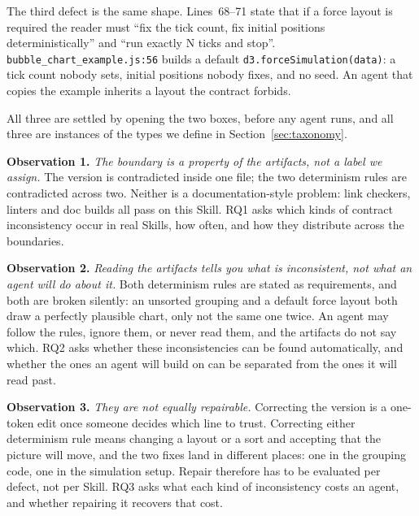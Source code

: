 The third defect is the same shape. Lines~68--71 state that if a force layout is
required the reader must ``fix the tick count, fix initial positions
deterministically'' and ``run exactly N ticks and stop''.
\texttt{bubble\_\allowbreak{}chart\_\allowbreak{}example.js:56} builds a default
\texttt{d3.force\allowbreak{}Simulation(data)}: a tick count nobody sets, initial positions
nobody fixes, and no seed. An agent that copies the example inherits a layout the
contract forbids.

All three are settled by opening the two boxes, before any agent runs, and all
three are instances of the types we define in Section~\ref{sec:taxonomy}.

\medskip\noindent\textbf{Observation 1.} \emph{The boundary is a property of the
artifacts, not a label we assign.} The version is contradicted inside one file;
the two determinism rules are contradicted across two. Neither is a
documentation-style problem: link checkers, linters and doc builds all pass on
this Skill. RQ1 asks which kinds of contract inconsistency occur in real Skills,
how often, and how they distribute across the boundaries.

\medskip\noindent\textbf{Observation 2.} \emph{Reading the artifacts tells you
what is inconsistent, not what an agent will do about it.} Both determinism
rules are stated as requirements, and both are broken silently: an unsorted
grouping and a default force layout both draw a perfectly plausible chart, only
not the same one twice. An agent may follow the rules, ignore them, or never read
them, and the artifacts do not say which. RQ2 asks whether these inconsistencies
can be found automatically, and whether the ones an agent will build on can be
separated from the ones it will read past.

\medskip\noindent\textbf{Observation 3.} \emph{They are not equally repairable.} Correcting the version is a one-token edit once someone decides
which line to trust. Correcting either determinism rule means changing a layout
or a sort and accepting that the picture will move, and the two fixes land in
different places: one in the grouping code, one in the simulation setup. Repair
therefore has to be evaluated per defect, not per Skill. RQ3 asks what each kind
of inconsistency costs an agent, and whether repairing it recovers that cost.
\endgroup
